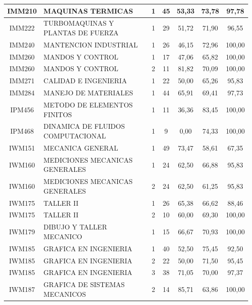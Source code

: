 \documentclass[12pt]{article}
\begin{document}
\begin{table}[H]
{\begin{tabular}{|c|l|c|c|c|c|c|}
\rowcolor[HTML]{DAEBFB} 
IMM210 & MAQUINAS TERMICAS & 1 & 45 & 53,33 & 73,78 & 97,78 \\ \hline
\rowcolor[HTML]{DAEBFB} 
IMM222 & TURBOMAQUINAS Y PLANTAS DE FUERZA & 1 & 29 & 51,72 & 71,90 & 96,55 \\ \hline
\rowcolor[HTML]{DAEBFB} 
IMM240 & MANTENCION INDUSTRIAL & 1 & 26 & 46,15 & 72,96 & 100,00 \\ \hline
\rowcolor[HTML]{DAEBFB} 
IMM260 & MANDOS Y CONTROL & 1 & 17 & 47,06 & 65,82 & 100,00 \\ \hline
\rowcolor[HTML]{DAEBFB} 
IMM260 & MANDOS Y CONTROL & 2 & 11 & 81,82 & 70,09 & 100,00 \\ \hline
\rowcolor[HTML]{DAEBFB} 
IMM271 & CALIDAD E INGENIERIA & 1 & 22 & 50,00 & 65,26 & 95,83 \\ \hline
\rowcolor[HTML]{DAEBFB} 
IMM284 & MANEJO DE MATERIALES & 1 & 44 & 65,91 & 69,41 & 97,73 \\ \hline
\rowcolor[HTML]{DAEBFB} 
IPM456 & METODO DE ELEMENTOS FINITOS & 1 & 11 & 36,36 & 83,45 & 100,00 \\ \hline
\rowcolor[HTML]{DAEBFB} 
IPM468 & DINAMICA DE FLUIDOS COMPUTACIONAL & 1 & 9 & 0,00 & 74,33 & 100,00 \\ \hline
\rowcolor[HTML]{DAEBFB} 
IWM151 & MECANICA GENERAL & 1 & 49 & 73,47 & 58,61 & 67,35 \\ \hline
\rowcolor[HTML]{DAEBFB} 
IWM160 & MEDICIONES MECANICAS GENERALES & 1 & 24 & 62,50 & 66,88 & 95,83 \\ \hline
\rowcolor[HTML]{DAEBFB} 
IWM160 & MEDICIONES MECANICAS GENERALES & 2 & 24 & 62,50 & 61,25 & 95,83 \\ \hline
\rowcolor[HTML]{DAEBFB} 
IWM175 & TALLER II & 1 & 26 & 65,38 & 66,62 & 88,46 \\ \hline
\rowcolor[HTML]{DAEBFB} 
IWM175 & TALLER II & 2 & 10 & 60,00 & 69,30 & 100,00 \\ \hline
\rowcolor[HTML]{DAEBFB} 
IWM179 & DIBUJO Y TALLER MECANICO & 1 & 15 & 66,67 & 70,93 & 100,00 \\ \hline
\rowcolor[HTML]{DAEBFB} 
IWM185 & GRAFICA EN INGENIERIA & 1 & 40 & 52,50 & 75,45 & 92,50 \\ \hline
\rowcolor[HTML]{DAEBFB} 
IWM185 & GRAFICA EN INGENIERIA & 2 & 22 & 50,00 & 71,50 & 95,45 \\ \hline
\rowcolor[HTML]{DAEBFB} 
IWM185 & GRAFICA EN INGENIERIA & 3 & 38 & 71,05 & 70,00 & 97,37 \\ \hline
\rowcolor[HTML]{DAEBFB} 
IWM187 & GRAFICA DE SISTEMAS MECANICOS & 2 & 14 & 85,71 & 63,86 & 100,00 \\ \hline

\end{tabular}}
\end{table}
\end{document}
